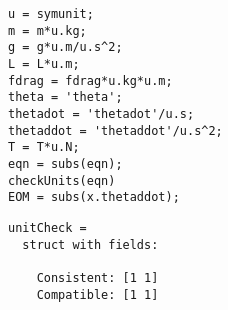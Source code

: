 \begin{lstlisting}[frame=lines,style=Matlab-editor]
% Checking EOM Units
u = symunit;
m = m*u.kg;
g = g*u.m/u.s^2;
L = L*u.m;
fdrag = fdrag*u.kg*u.m;
theta = 'theta';
thetadot = 'thetadot'/u.s;
thetaddot = 'thetaddot'/u.s^2;
T = T*u.N;
eqn = subs(eqn);
checkUnits(eqn)
EOM = subs(x.thetaddot);
\end{lstlisting}
\color{gray} \begin{verbatim}
unitCheck =
  struct with fields:

    Consistent: [1 1]
    Compatible: [1 1]
\end{verbatim} \color{black}
